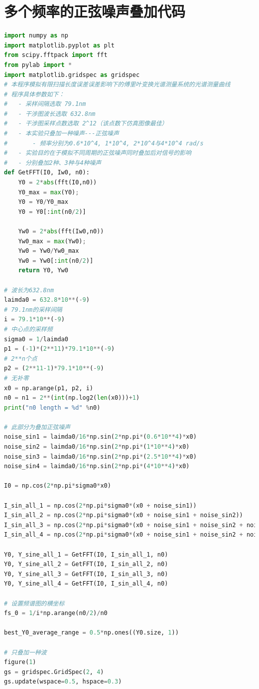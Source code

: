 \documentclass[conference]{IEEEtran}
\begin{document}
\section{多个频率的正弦噪声叠加代码}
\begin{lstlisting}[language=python]
import numpy as np
import matplotlib.pyplot as plt
from scipy.fftpack import fft
from pylab import *
import matplotlib.gridspec as gridspec
# 本程序模拟有限扫描长度误差误差影响下的傅里叶变换光谱测量系统的光谱测量曲线
# 程序具体参数如下：
#   - 采样间隔选取 79.1nm
#   - 干涉图波长选取 632.8nm
#   - 干涉图采样点数选取 2^12（该点数下仿真图像最佳）
#   - 本实验只叠加一种噪声---正弦噪声
#       - 频率分别为0.6*10^4, 1*10^4, 2*10^4与4*10^4 rad/s
#   - 实验目的在于模拟不同周期的正弦噪声同时叠加后对信号的影响
#   - 分别叠加2种、3种与4种噪声
def GetFFT(I0, Iw0, n0):
    Y0 = 2*abs(fft(I0,n0))
    Y0_max = max(Y0);
    Y0 = Y0/Y0_max
    Y0 = Y0[:int(n0/2)]

    Yw0 = 2*abs(fft(Iw0,n0))
    Yw0_max = max(Yw0);
    Yw0 = Yw0/Yw0_max
    Yw0 = Yw0[:int(n0/2)]
    return Y0, Yw0

# 波长为632.8nm
laimda0 = 632.8*10**(-9)
# 79.1nm的采样间隔 
i = 79.1*10**(-9)
# 中心点的采样频
sigma0 = 1/laimda0
p1 = (-1)*(2**11)*79.1*10**(-9)
# 2**n个点 
p2 = (2**11-1)*79.1*10**(-9)
# 无补零 
x0 = np.arange(p1, p2, i)
n0 = n1 = 2**(int(np.log2(len(x0)))+1)
print("n0 length = %d" %n0)

# 此部分为叠加正弦噪声
noise_sin1 = laimda0/16*np.sin(2*np.pi*(0.6*10**4)*x0)
noise_sin2 = laimda0/16*np.sin(2*np.pi*(1*10**4)*x0)
noise_sin3 = laimda0/16*np.sin(2*np.pi*(2.5*10**4)*x0)
noise_sin4 = laimda0/16*np.sin(2*np.pi*(4*10**4)*x0)

I0 = np.cos(2*np.pi*sigma0*x0)

I_sin_all_1 = np.cos(2*np.pi*sigma0*(x0 + noise_sin1))
I_sin_all_2 = np.cos(2*np.pi*sigma0*(x0 + noise_sin1 + noise_sin2))
I_sin_all_3 = np.cos(2*np.pi*sigma0*(x0 + noise_sin1 + noise_sin2 + noise_sin3))
I_sin_all_4 = np.cos(2*np.pi*sigma0*(x0 + noise_sin1 + noise_sin2 + noise_sin3 + noise_sin4))

Y0, Y_sine_all_1 = GetFFT(I0, I_sin_all_1, n0)
Y0, Y_sine_all_2 = GetFFT(I0, I_sin_all_2, n0)
Y0, Y_sine_all_3 = GetFFT(I0, I_sin_all_3, n0)
Y0, Y_sine_all_4 = GetFFT(I0, I_sin_all_4, n0)

# 设置频谱图的横坐标
fs_0 = 1/i*np.arange(n0/2)/n0

best_Y0_average_range = 0.5*np.ones((Y0.size, 1))

# 只叠加一种波
figure(1)
gs = gridspec.GridSpec(2, 4)
gs.update(wspace=0.5, hspace=0.3)


\end{lstlisting}
\end{document}
